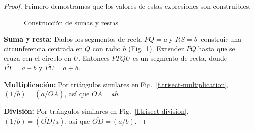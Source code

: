 \begin{proof} Primero demostramos que los valores de estas expresiones son construibles.

\begin{figure}[b]
\begin{center}
\end{center}
\caption{Construcción de sumas y restas}\label{f.trisect-add-subtract}
\end{figure}

\noindent\textbf{Suma y resta:}
Dados los segmentos de recta $\overline{PQ}=a$ y $\overline{RS}=b$, construir una circunferencia centrada en $Q$ con radio $b$ (Fig.~\ref{f.trisect-add-subtract}). Extender $\overline{PQ}$ hasta que se cruza con el círculo en $U$. Entonces $\overline{PTQU}$ es un segmento de recta, donde $\overline{PT}=a-b$ y $\overline{PU}=a+b$.

\noindent\textbf{Multiplicación:}
Por triángulos similares en Fig.~\ref{f.trisect-multiplication},
$(1/b)=(a/\overline{OA})$, así que $\overline{OA}=ab$.

\noindent\textbf{División:}
Por triángulos similares en Fig.~\ref{f.trisect-division},
$(1/b)=(\overline{OD}/a)$, así que $\overline{OD}=(a/b)$.


\end{proof}

